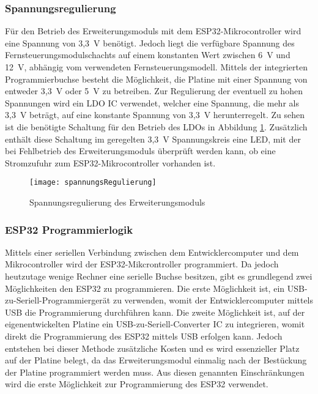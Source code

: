 \subsubsection{Spannungsregulierung}
Für den Betrieb des Erweiterungsmoduls mit dem ESP32-Mikrocontroller wird eine Spannung von 3,3~V benötigt. Jedoch liegt die verfügbare Spannung des Fernsteuerungsmodulschachts auf einem konstanten Wert zwischen 6~V und 12~V, abhängig vom verwendeten Fernsteuerungsmodell. Mittels der integrierten Programmierbuchse besteht die Möglichkeit, die Platine mit einer Spannung von entweder 3,3~V oder 5~V zu betreiben. Zur Regulierung der eventuell zu hohen Spannungen wird ein \ac{LDO} \ac{IC} verwendet, welcher eine Spannung, die mehr als 3,3~V beträgt, auf eine konstante Spannung von 3,3~V herunterregelt. Zu sehen ist die benötigte Schaltung für den Betrieb des \acp{LDO} in Abbildung \ref{fig:spannungsRegulierung}. Zusätzlich enthält diese Schaltung im geregelten 3,3~V Spannungskreis eine \acs{LED}, mit der bei Fehlbetrieb des Erweiterungsmoduls überprüft werden kann, ob eine Stromzufuhr zum ESP32-Mikrocontroller vorhanden ist.

\begin{figure}[h]
    \centering
    \texttt{[image: spannungsRegulierung]}
    \caption{Spannungsregulierung des Erweiterungsmoduls}
    \label{fig:spannungsRegulierung}
\end{figure}

\subsubsection{ESP32 Programmierlogik}
Mittels einer seriellen Verbindung zwischen dem Entwicklercomputer und dem Mikrocontroller wird der ESP32-Mikcrontroller programmiert. Da jedoch heutzutage wenige Rechner eine serielle Buchse besitzen, gibt es grundlegend zwei Möglichkeiten den ESP32 zu programmieren. Die erste Möglichkeit ist, ein USB-zu-Seriell-Programmiergerät zu verwenden, womit der Entwicklercomputer mittels USB die Programmierung durchführen kann. Die zweite Möglichkeit ist, auf der eigenentwickelten Platine ein USB-zu-Seriell-Converter \ac{IC} zu integrieren, womit direkt die Programmierung des ESP32 mittels USB erfolgen kann. Jedoch entstehen bei dieser Methode zusätzliche Kosten und es wird essenzieller Platz auf der Platine belegt, da das Erweiterungsmodul einmalig nach der Bestückung der Platine programmiert werden muss. Aus diesen genannten Einschränkungen wird die erste Möglichkeit zur Programmierung des ESP32 verwendet.


